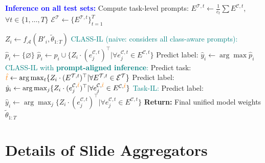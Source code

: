 \documentclass[10pt,twocolumn,letterpaper]{article}
\begin{document}
\begin{algorithm}
\begin{algorithmic}[1]
\State \textcolor{blue}{\textbf{Inference on all test sets:}}
\State Compute task-level prompts: $E^{\mathcal{T},t} \leftarrow \frac{1}{c_t} \sum E^{\mathcal{C},t}$, $\forall t \in \{1,\dots,T\}$
\State $\mathcal{E}^\mathcal{T} \leftarrow \{E^{\mathcal{T},t}\}_{t=1}^{T}$

  \State $Z_i \leftarrow f_{\mathcal{A}}(B'_i, \tilde{\theta}_{1:T})$
  \State \textcolor{teal}{CLASS-IL (naive: considers all class-aware prompts):}
  \State $\hat{p}_i \leftarrow \{\varnothing\}$
  \State $\hat{p}_i \leftarrow \hat{p}_i \cup \{Z_i \cdot (e^{\mathcal{C},{t}}_{j})^\top\vert\forall e^{\mathcal{C},{t}}_{j}\in E^{\mathcal{C},t}\}$
  \EndFor
  \State Predict label: $\hat{y}_i \leftarrow \arg \max \hat{p}_i$
  \State \textcolor{teal}{CLASS-IL with \textbf{prompt-aligned inference}:} 
  \State Predict task: $\textcolor{orange}{\hat{t}} \leftarrow \arg \max_t \{Z_i \cdot (E^{\mathcal{T},t})^\top|\forall E^{\mathcal{T},t} \in \mathcal{E}^{\mathcal{T}}\}$
  \State Predict label: $\hat{y}_i \leftarrow \arg \max_j \{Z_i \cdot (e^{\mathcal{C},\textcolor{orange}{\hat{t}}}_{j})^\top\vert\forall e^{\mathcal{C},\textcolor{orange}{\hat{t}}}_{j}\in E^{\mathcal{C},\textcolor{orange}{\hat{t}}}\}$
  \State \textcolor{teal}{Task-IL:}
  \State Predict label: $\hat{y}_i \leftarrow \arg \max_j \{Z_i \cdot (e^{\mathcal{C},{t}}_{j})^\top\vert\forall e^{\mathcal{C},{t}}_{j}\in E^{\mathcal{C},t}\}$
\EndFor
\EndFor
\State \textbf{Return:} Final unified model weights $\tilde{\theta}_{1:T}$
\end{algorithmic}
\end{algorithm}

\section{Details of Slide Aggregators}\label{sec:backbone}
\end{document}

